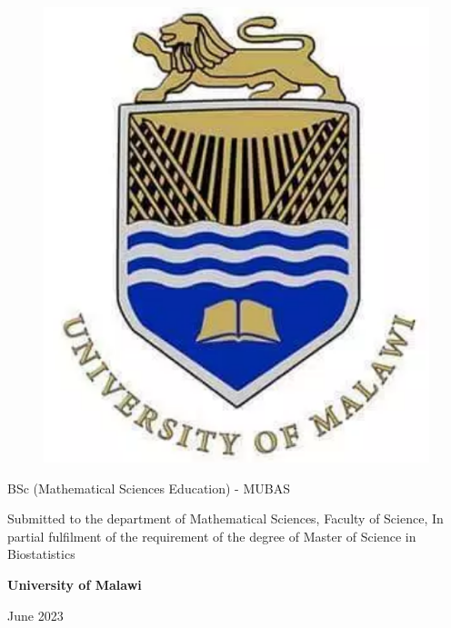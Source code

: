 \begin{center}


\begin{figure}[H]
\begin{center}
\includegraphics[scale=0.2]{Unima_Logo.png}
\end{center}
\end{figure}



\vspace*{1cm}





{BSc (Mathematical Sciences Education) - MUBAS}

\vspace*{1cm}

{\normalsize Submitted to the department of Mathematical Sciences, Faculty of Science, In partial fulfilment of the requirement of the degree of Master of Science in Biostatistics}

{\bfseries University of Malawi}

\vspace*{1cm}

{June 2023}

\end{center}

\newpage